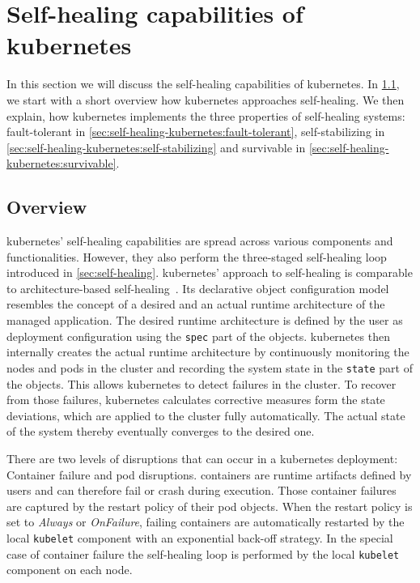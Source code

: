 
\section{Self-healing capabilities of \gls{kubernetes}}\label{sec:self-healing-kubernetes}
  In this section we will discuss the self-healing capabilities of \gls{kubernetes}.
  In \cref{sec:self-healing-kubernetes:overview}, we start with a short overview how \gls{kubernetes} approaches self-healing.
  We then explain, how \gls{kubernetes} implements the three properties of self-healing systems: fault-tolerant in \cref{sec:self-healing-kubernetes:fault-tolerant}, self-stabilizing in \cref{sec:self-healing-kubernetes:self-stabilizing} and survivable in \cref{sec:self-healing-kubernetes:survivable}.

\subsection{Overview}\label{sec:self-healing-kubernetes:overview}
  \gls{kubernetes}' self-healing capabilities are spread across various components and functionalities.
  However, they also perform the three-staged self-healing loop introduced in \cref{sec:self-healing}.
  \gls{kubernetes}' approach to self-healing is comparable to architecture-based self-healing~\cite{ToffettiMicroservices,DashofyArchitecture}.
  Its declarative object configuration model resembles the concept of a desired and an actual runtime architecture of the managed application.
  The desired runtime architecture is defined by the user as deployment configuration using the \texttt{spec} part of the objects.
  \Gls{kubernetes} then internally creates the actual runtime architecture by continuously monitoring the nodes and pods in the cluster and recording the system state in the \texttt{state} part of the objects.
  This allows \gls{kubernetes} to detect failures in the cluster.
  To recover from those failures, \gls{kubernetes} calculates corrective measures form the state deviations, which are applied to the cluster fully automatically.
  The actual state of the system thereby eventually converges to the desired one.

  There are two levels of disruptions that can occur in a \gls{kubernetes} deployment: Container failure and pod disruptions.
  containers are runtime artifacts defined by users and can therefore fail or crash during execution.
  Those container failures are captured by the restart policy of their pod objects.
  When the restart policy is set to \textit{Always} or \textit{OnFailure}, failing containers are automatically restarted by the local \texttt{kubelet} component with an exponential back-off strategy.
  In the special case of container failure the self-healing loop is performed by the local \texttt{kubelet} component on each node.

